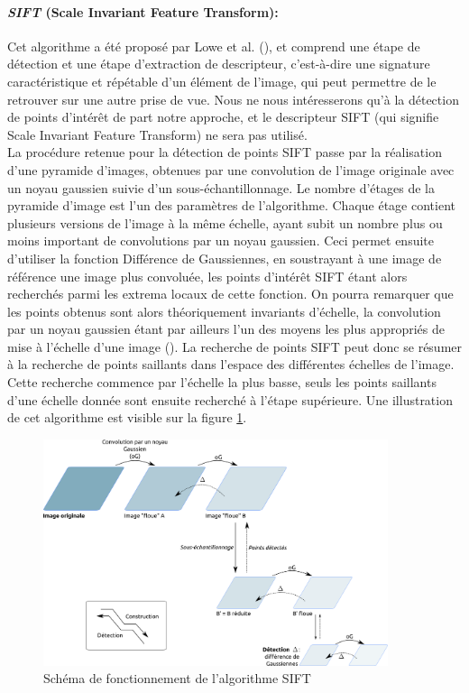 \paragraph{\emph{SIFT} (Scale Invariant Feature Transform):\\}
Cet algorithme a été proposé par Lowe et al. (\cite{Lowe1999a}), et comprend une étape de détection et une étape d'extraction de descripteur, c'est-à-dire une signature caractéristique et répétable d'un élément de l'image, qui peut permettre de le retrouver sur une autre prise de vue. Nous ne nous intéresserons qu'à la détection de points d'intérêt de part notre approche, et le descripteur SIFT (qui signifie Scale Invariant Feature Transform) ne sera pas utilisé.\\
La procédure retenue pour la détection de points SIFT passe par la réalisation d'une pyramide d'images, obtenues par une convolution de l'image originale avec un noyau gaussien suivie d'un sous-échantillonnage. Le nombre d'étages de la pyramide d'image est l'un des paramètres de l'algorithme. Chaque étage contient plusieurs versions de l'image à la même échelle, ayant subit un nombre plus ou moins important de convolutions par un noyau gaussien. Ceci permet ensuite d'utiliser la fonction \og Différence de Gaussiennes\fg{}, en soustrayant à une image de référence une image plus convoluée, les points d'intérêt SIFT étant alors recherchés parmi les extrema locaux de cette fonction. On pourra remarquer que les points obtenus sont alors théoriquement invariants d'échelle, la convolution par un noyau gaussien étant par ailleurs l'un des moyens les plus appropriés de mise à l'échelle d'une image (\cite{Lindeberg1994}). La recherche de points SIFT peut donc se résumer à la recherche de points saillants dans l'espace des différentes échelles de l'image. Cette recherche commence par l'échelle la plus basse, seuls les points saillants d'une échelle donnée sont ensuite recherché à l'étape supérieure. Une illustration de cet algorithme est visible sur la figure \ref{fig:ch3_SIFT}.

\begin{figure}
	\centerline{
		\includegraphics[width=0.9\textwidth]{Chapter3/graphics/SIFT.png}
		}
	\caption{Schéma de fonctionnement de l'algorithme SIFT}
	\label{fig:ch3_SIFT}
\end{figure}

